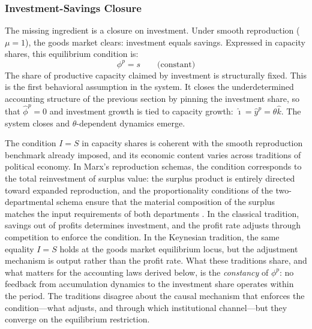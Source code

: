
\subsubsection{Investment-Savings Closure}
\label{sec:IS_closure}

The missing ingredient is a closure on investment. Under smooth reproduction ($\mu = 1$), the goods market clears: investment equals savings. Expressed in capacity shares, this equilibrium condition is:
%
\begin{equation}\label{eq:IS_closure}
	\phi^p = s \qquad \text{(constant)}
\end{equation}
%
The share of productive capacity claimed by investment is structurally fixed. This is the first behavioral assumption in the system. It closes the underdetermined accounting structure of the previous section by pinning the investment share, so that $\hat{\phi}^p = 0$ and investment growth is tied to capacity growth: $\hat{\imath} = \hat{y}^p = \theta\hat{k}$. The system closes and $\theta$-dependent dynamics emerge.

The condition $I = S$ in capacity shares is coherent with the smooth reproduction benchmark already imposed, and its economic content varies across traditions of political economy. In Marx's reproduction schemas, the condition corresponds to the total reinvestment of surplus value: the surplus product is entirely directed toward expanded reproduction, and the proportionality conditions of the two-departmental schema ensure that the material composition of the surplus matches the input requirements of both departments \citep{MarxKVII}. In the classical tradition, savings out of profits determines investment, and the profit rate adjusts through competition to enforce the condition. In the Keynesian tradition, the same equality $I = S$ holds at the goods market equilibrium locus, but the adjustment mechanism is output rather than the profit rate. What these traditions share, and what matters for the accounting laws derived below, is the \emph{constancy} of $\phi^p$: no feedback from accumulation dynamics to the investment share operates within the period. The traditions disagree about the causal mechanism that enforces the condition---what adjusts, and through which institutional channel---but they converge on the equilibrium restriction.


